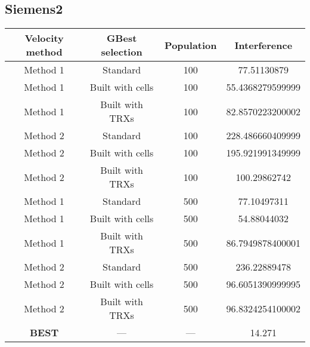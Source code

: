 \subsection{Siemens2}
\begin{center}
	\begin{tabular}{| c | c | c | c |}
	\hline
	Velocity method & GBest selection & Population & Interference\\ \hline
	Method 1 & Standard & 100 & 77.51130879\\ \hline
	Method 1 & Built with cells & 100 & 55.4368279599999\\ \hline
	Method 1 & Built with TRXs & 100 & 82.8570223200002\\ \hline
	Method 2 & Standard & 100 & 228.486660409999\\ \hline
	Method 2 & Built with cells & 100 & 195.921991349999\\ \hline
	Method 2 & Built with TRXs & 100 & 100.29862742\\ \hline
	Method 1 & Standard & 500 & 77.10497311\\ \hline
	Method 1 & Built with cells & 500 & 54.88044032\\ \hline
	Method 1 & Built with TRXs & 500 & 86.7949878400001\\ \hline
	Method 2 & Standard & 500 & 236.22889478\\ \hline
	Method 2 & Built with cells & 500 & 96.6051390999995\\ \hline
	Method 2 & Built with TRXs & 500 & 96.8324254100002\\ \hline
	\textbf{BEST} & --- & --- & 14.271\\ \hline
	\end{tabular}
\end{center}
